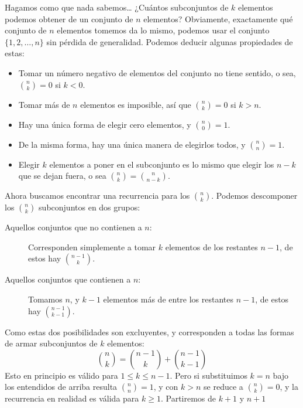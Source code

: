   Hagamos como que nada sabemos\ldots
  ¿Cuántos subconjuntos de \(k\)
  elementos podemos obtener de un conjunto de \(n\) elementos?
  Obviamente,
  exactamente qué conjunto de \(n\) elementos tomemos da lo mismo,
  podemos usar el conjunto \(\{1, 2, \dotsc, n\}\)
  sin pérdida de generalidad.
  Podemos deducir algunas propiedades de estas:
  \begin{itemize}
  \item
    Tomar un número negativo de elementos
    del conjunto no tiene sentido,
    o sea,
    \(\binom{n}{k} = 0\) si \(k < 0\).
  \item
    Tomar más de \(n\) elementos es imposible,
    así que \(\binom{n}{k} = 0\) si \(k > n\).
  \item
    Hay una única forma de elegir cero elementos,
    y \(\binom{n}{0} = 1\).
  \item
    De la misma forma,
    hay una única manera de elegirlos todos,
    y \(\binom{n}{n} = 1\).
  \item
    Elegir \(k\) elementos a poner en el subconjunto
    es lo mismo que elegir los \(n - k\) que se dejan fuera,
    o sea \(\binom{n}{k} = \binom{n}{n - k}\).
  \end{itemize}
  Ahora buscamos encontrar
  una recurrencia para los \(\binom{n}{k}\).
  Podemos descomponer los \(\binom{n}{k}\) subconjuntos
  en dos grupos:
  \begin{description}
  \item[\boldmath Aquellos conjuntos
	que no contienen a \(n\):\unboldmath]
    Corresponden simplemente a tomar \(k\) elementos
    de los restantes \(n - 1\),
    de estos hay \(\binom{n - 1}{k}\).
  \item[\boldmath Aquellos conjuntos
	que contienen a \(n\):\unboldmath]
    Tomamos \(n\),
    y \(k - 1\) elementos más de entre los restantes \(n - 1\),
    de estos hay \(\binom{n - 1}{k - 1}\).
  \end{description}
  Como estas dos posibilidades son excluyentes,
  y corresponden a todas las formas
  de armar subconjuntos de \(k\) elementos:
  \begin{equation*}
    \binom{n}{k} = \binom{n - 1}{k} + \binom{n - 1}{k - 1}
  \end{equation*}
  Esto en principio es válido para \(1 \le k \le n - 1\).
  Pero si substituimos \(k = n\) bajo los entendidos de arriba
  resulta \(\binom{n}{n} = 1\),
  y con \(k > n\) se reduce a \(\binom{n}{k} = 0\),
  y la recurrencia en realidad es válida para \(k \ge 1\).
  Partiremos de \(k + 1\) y \(n + 1\)
